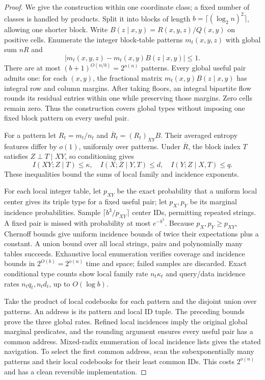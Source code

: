 \documentclass[10pt,a4paper]{article}
\theoremstyle{definition}
\begin{document}
\begin{proof}
We give the construction within one coordinate class; a fixed number
of classes is handled by products. Split it into blocks of length
$b=\lceil(\log_2 n)^2\rceil$, allowing one shorter block.
Write $B(z\mid x,y)=R(x,y,z)/Q(x,y)$ on positive cells. Enumerate the
integer block-table patterns $m_t(x,y,z)$ with global sum $nR$ and
\[
 |m_t(x,y,z)-m_t(x,y)B(z\mid x,y)|\le1.
\]
There are at most $(b+1)^{O(n/b)}=2^{o(n)}$ patterns.
Every global useful pair admits one: for each $(x,y)$, the fractional
matrix $m_t(x,y)B(z\mid x,y)$ has integral row and column margins.
After taking floors, an integral bipartite flow rounds its residual
entries within one while preserving those margins. Zero cells remain zero.
Thus the construction covers global types without imposing one fixed
block pattern on every useful pair.

For a pattern let $R_t=m_t/n_t$ and $\overline R_t=(R_t)_{XY}B$.
Their averaged entropy features differ by $o(1)$, uniformly over patterns.
Under $\overline R$, the block index $T$ satisfies $Z\perp T\mid XY$,
so conditioning gives
\[
 I(XY;Z\mid T)\le\kappa,\quad
 I(X;Z\mid Y,T)\le d,\quad I(Y;Z\mid X,T)\le q.
\]
These inequalities bound the sums of local family and incidence exponents.

For each local integer table, let $p_{XY}$ be the exact probability that
a uniform local center gives its triple type for a fixed useful pair;
let $p_X,p_Y$ be its marginal incidence probabilities. Sample
$\lceil b^3/p_{XY}\rceil$ center IDs, permitting repeated strings.
A fixed pair is missed with probability at most $e^{-b^3}$.
Because $p_X,p_Y\ge p_{XY}$, Chernoff bounds give uniform incidence
bounds of twice their expectations plus a constant. A union bound over
all local strings, pairs and polynomially many tables succeeds.
Exhaustive local enumeration verifies coverage and incidence bounds in
$2^{O(b)}=2^{o(n)}$ time and space; failed samples are discarded.
Exact conditional type counts show local family rate $n_t\kappa_t$
and query/data incidence rates $n_tq_t,n_td_t$, up to $O(\log b)$.

Take the product of local codebooks for each pattern and the disjoint
union over patterns. An address is its pattern and local ID tuple.
The preceding bounds prove the three global rates. Refined local
incidences imply the original global marginal predicates, and the
rounding argument ensures every useful pair has a common address.
Mixed-radix enumeration of local incidence lists gives the stated
navigation. To select the first common address, scan the subexponentially
many patterns and their local codebooks for their least common IDs.
This costs $2^{o(n)}$ and has a clean reversible implementation.


\end{proof}
\end{document}
